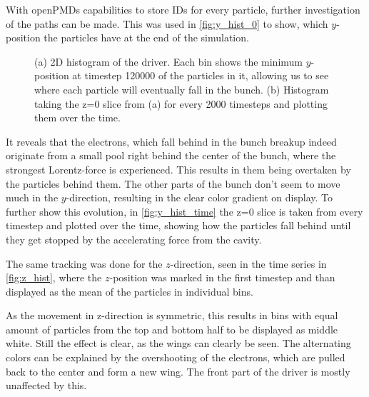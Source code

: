 \documentclass[bachelor_thesis]{subfiles}
\begin{document}
With openPMDs capabilities to store IDs for every particle, further investigation of the paths can be made. This was used in \autoref{fig:y_hist_0} to show, which $y$-position the particles have at the end of the simulation.
\begin{figure}
	\centering
	\begin{subfigure}{0.5\textwidth}
	\centering
	\missingfigure{}
	\caption{} \label{fig:y_hist_0}
	\end{subfigure}
	\hfill
	\begin{subfigure}{0.5\textwidth}
	\centering
	\missingfigure{}
	\caption{} \label{fig:y_hist_time}
	\end{subfigure}
	\caption{(a) 2D histogram of the driver. Each bin shows the minimum $y$-position at timestep \num{120000} of the particles in it, allowing us to see where each particle will eventually fall in the bunch.
	(b) Histogram taking the z=0 slice from (a) for every 2000 timesteps and plotting them over the time.}
	\label{fig:y_hist}
\end{figure} 
It reveals that the electrons, which fall behind in the bunch breakup indeed originate from a small pool right behind the center of the bunch, where the strongest Lorentz-force is experienced. This results in them being overtaken by the particles behind them.
The other parts of the bunch don't seem to move much in the $y$-direction, resulting in the clear color gradient on display. To further show this evolution, in \autoref{fig:y_hist_time} the z=0 slice is taken from every timestep and plotted over the time,
showing how the particles fall behind until they get stopped by the accelerating force from the cavity.

The same tracking was done for the $z$-direction, seen in the time series in \autoref{fig:z_hist}, where the $z$-position was marked in the first timestep and than displayed as the mean of the particles in individual bins.
\begin{figure}
	\centering
	\missingfigure{}
	\caption{}
	\label{fig:z_hist}
\end{figure}
As the movement in z-direction is symmetric, this results in bins with equal amount of particles from the top and bottom half to be displayed as middle white. Still the effect is clear, as the wings can clearly be seen.
The alternating colors can be explained by the overshooting of the electrons, which are pulled back to the center and form a new wing. The front part of the driver is mostly unaffected by this.
\end{document}
